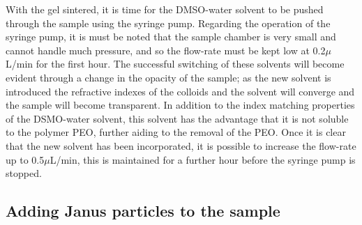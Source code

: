 With the gel sintered, it is time for the DMSO-water solvent to be pushed through the sample using the syringe pump. Regarding the operation of the syringe pump, it is must be noted that the sample chamber is very small and cannot handle much pressure, and so the flow-rate must be kept low at 0.2$\mu$L/min for the first hour. The successful switching of these solvents will become evident through a change in the opacity of the sample; as the new solvent is introduced the refractive indexes of the colloids and the solvent will converge and the sample will become transparent. In addition to the index matching properties of the DSMO-water solvent, this solvent has the advantage that it is not soluble to the polymer PEO, further aiding to the removal of the PEO. Once it is clear that the new solvent has been incorporated, it is possible to increase the flow-rate up to  0.5$\mu$L/min, this is maintained for a further hour before the syringe pump is stopped. 




\subsection{Adding Janus particles to the sample}


